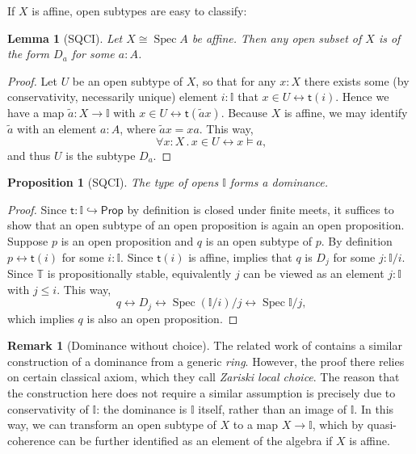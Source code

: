 \documentclass[a4paper,12pt]{amsart}
\newtheorem{lemma}[theorem]{Lemma}
\newtheorem{proposition}[theorem]{Proposition}
\theoremstyle{definition}
\newtheorem{remark}[theorem]{Remark}
\newcommand{\mbb}[1]{\mathbb{#1}}
\newcommand{\T}{\mbb T}
\newcommand{\I}{\mbb I}
\newcommand{\ms}[1]{\mathsf{#1}}
\newcommand{\qsi}[1]{\tilde{#1}}
\newcommand{\hook}{\hookrightarrow}
\newcommand{\fa}[2]{\forall #1\!\colon\!\!#2\mathpunct{.}}
\newcommand{\eq}{\leftrightarrow}
\newcommand{\pp}{\ms{Prop}}
\newcommand{\spec}{\operatorname{Spec}}
\newcommand\istsym{\ms{t}}
\newcommand\ist[1]{\istsym(#1)}
\begin{document}
If $X$ is affine, open subtypes are easy to classify:

\begin{lemma}[SQCI]\label{lem:openofaffinegivesalgebra}
  Let $X \cong \spec A$ be affine. Then any open subset of $X$ is of the form $D_a$ for some $a:A$.
\end{lemma}
\begin{proof}
  Let $U$ be an open subtype of $X$, so that for any $x:X$ there exists some (by conservativity, necessarily unique) element $i:\I$ that $x \in U \eq \ist{i}$.
  Hence we have a map $\qsi a \colon X \to \I$ with $x \in U \eq \ist{\qsi ax}$. Because $X$ is affine, we may identify $\qsi a$ with an element $a:A$, where $\qsi ax = xa$. This way,
  \[ \fa xX x \in U \eq x \models a\text{,} \]
  and thus $U$ is the subtype $D_a$.
\end{proof}

\begin{proposition}[SQCI]\label{prop:Idominance}
  The type of opens $\I$ forms a dominance.
\end{proposition}
\begin{proof}
  Since $\istsym\colon \I \hook \pp$ by definition is closed under finite meets, it suffices to show that an open subtype of an open proposition is again an open proposition. Suppose $p$ is an open proposition and $q$ is an open subtype of $p$. By definition $p \eq \ist{i}$ for some $i:\I$. Since $\ist{i}$ is affine,  implies that $q$ is $D_j$ for some $j : \I/i$. Since $\T$ is propositionally stable, equivalently $j$ can be viewed as an element $j : \I$ with $j \le i$. This way, 
  \[ q \eq D_j \eq \spec(\I/i)/j \eq \spec\I/j\text{,} \]
  which implies $q$ is also an open proposition.
\end{proof}

\begin{remark}[Dominance without choice]\label{rem:dominancewithoutchoice}
  The related work of \citet{Cherubini_Coquand_Hutzler_2024} contains a similar construction of a dominance from a generic \emph{ring}. However, the proof there relies on certain classical axiom, which they call \emph{Zariski local choice}. The reason that the construction here does not require a similar assumption is precisely due to conservativity of $\I$: the dominance is $\I$ itself, rather than an image of $\I$. In this way, we can transform an open subtype of $X$ to a map $X \to \I$, which by quasi-coherence can be further identified as an element of the algebra if $X$ is affine. 
\end{remark}
\end{document}
